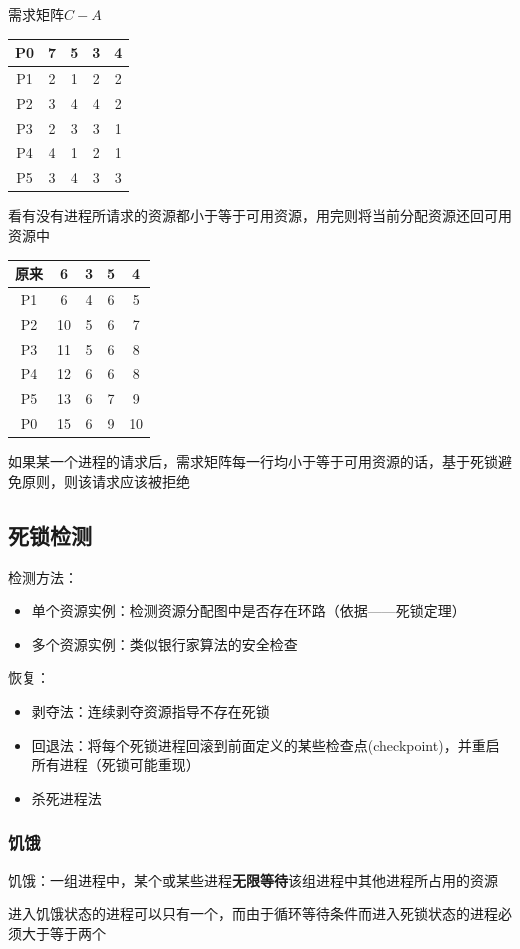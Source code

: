 \begin{analysis}
    需求矩阵$C-A$
    \begin{center}
        \begin{tabular}{|c|c|c|c|c|}\hline
            P0 & 7 & 5 & 3 & 4\\\hline
            P1 & 2 & 1 & 2 & 2\\\hline
            P2 & 3 & 4 & 4 & 2\\\hline
            P3 & 2 & 3 & 3 & 1\\\hline
            P4 & 4 & 1 & 2 & 1\\\hline
            P5 & 3 & 4 & 3 & 3\\\hline
        \end{tabular}
    \end{center}
    看有没有进程所请求的资源都小于等于可用资源，用完则将当前分配资源还回可用资源中
    \begin{center}
        \begin{tabular}{|c|c|c|c|c|}\hline
            原来 & 6 & 3 & 5 & 4\\\hline
            P1 & 6 & 4 & 6 & 5\\\hline
            P2 & 10 & 5 & 6 & 7\\\hline
            P3 & 11 & 5 & 6 & 8\\\hline
            P4 & 12 & 6 & 6 & 8\\\hline
            P5 & 13 & 6 & 7 & 9\\\hline
            P0 & 15 & 6 & 9 & 10\\\hline
        \end{tabular}
    \end{center}
    如果某一个进程的请求后，需求矩阵每一行均小于等于可用资源的话，基于死锁避免原则，则该请求应该被拒绝
\end{analysis}

\subsection{死锁检测}
检测方法：
\begin{itemize}
    \item 单个资源实例：检测资源分配图中是否存在环路（依据——死锁定理）
    \item 多个资源实例：类似银行家算法的安全检查
\end{itemize}

恢复：
\begin{itemize}
    \item 剥夺法：连续剥夺资源指导不存在死锁
    \item 回退法：将每个死锁进程回滚到前面定义的某些检查点(checkpoint)，并重启所有进程（死锁可能重现）
    \item 杀死进程法
\end{itemize}

\subsubsection{饥饿}
饥饿：一组进程中，某个或某些进程\textbf{无限等待}该组进程中其他进程所占用的资源

进入饥饿状态的进程可以只有一个，而由于循环等待条件而进入死锁状态的进程必须大于等于两个